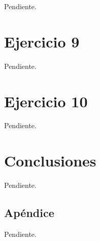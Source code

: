 \documentclass[a4paper,10pt,twoside]{article}
\begin{document}
Pendiente.




\section{Ejercicio 9}

Pendiente.




\section{Ejercicio 10}

Pendiente.




\section{Conclusiones}

Pendiente.



\newpage

\begin{appendices}

\section{Apéndice}

Pendiente.


\end{appendices}
\end{document}
